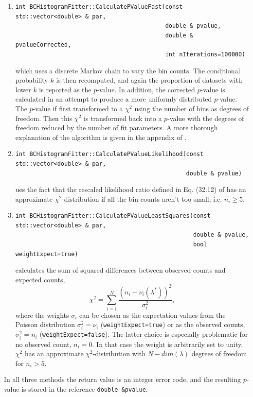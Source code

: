 \documentclass[11pt, a4paper]{article}
\begin{document}
\begin{enumerate}
\item
%
\begin{verbatim}
int BCHistogramFitter::CalculatePValueFast(const std::vector<double> & par,
                                           double & pvalue,
                                           double & pvalueCorrected,
                                           int nIterations=100000)
\end{verbatim}
%
which uses a discrete Markov chain to vary the bin counts.  The conditional
probability $k$ is then recomputed, and again the proportion of datasets with
lower $k$ is reported as the $p$-value. In addition, the corrected $p$-value is
calculated in an attempt to produce a more uniformly distributed $p$-value. The
$p$-value if first transformed to a $\chi^2$ using the number of bins as degrees
of freedom. Then this $\chi^2$ is transformed back into a $p$-value with the
degrees of freedom reduced by the number of fit parameters. A more thorough
explanation of the algorithm is given in the appendix of
\cite{BAT_pValue}.
\item
%
\begin{verbatim}
int BCHistogramFitter::CalculatePValueLikelihood(const std::vector<double> & par,
                                                 double & pvalue)
\end{verbatim}
%
ues the fact that the rescaled likelihood ratio defined in
Eq. (32.12) of \cite{PDGstatistics} has an approximate
$\chi^2$-distribution if all the bin counts aren't too small;
i.e. $n_i \ge 5$.

\item
%
\begin{verbatim}
int BCHistogramFitter::CalculatePValueLeastSquares(const std::vector<double> & par,
                                                   double & pvalue,
                                                   bool weightExpect=true)
\end{verbatim}
%
calculates the sum of squared differences between observed counts and
expected counts, $$\chi^2 = \sum_{i=1}^N \frac{\left(n_i -
\nu_i(\lambda^{*})\right)^2}{\sigma_i^2},$$ where the weights
$\sigma_i$ can be chosen as the expectation values from the Poisson
distribution $\sigma_i^2 = \nu_i$ (\verb|weightExpect=true|) or as the
observed counts, $\sigma_i^2 = n_i$ (\verb|weightExpect=false|).  The
latter choice is especially problematic for no observed count, $n_i
=0$. In that case the weight is arbitrarily set to unity.  $\chi^2$
has an approximate $\chi^2$-distribution with $N-dim(\lambda)$ degrees
of freedom for $n_i>5$.
\end{enumerate}
In all three methods the return value is an integer error code, and
the resulting $p$-value is stored in the reference
\verb|double &pvalue|.
\end{document}
